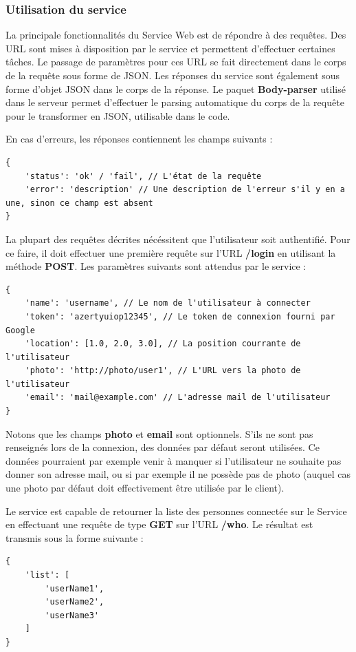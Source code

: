 \subsubsection{Utilisation du service}

La principale fonctionnalités du Service Web est de répondre à des requêtes. Des URL sont mises à disposition par le service et permettent d'effectuer certaines tâches. Le passage de paramètres pour ces URL se fait directement dans le corps de la requête sous forme de JSON.
Les réponses du service sont également sous forme d'objet JSON dans le corps de la réponse.
Le paquet \textbf{Body-parser} utilisé dans le serveur permet d'effectuer le parsing automatique du corps de la requête pour le transformer en JSON, utilisable dans le code.

En cas d'erreurs, les réponses contiennent les champs suivants :
\lstset{language=Javascript}
\begin{lstlisting}[caption=Corps général de la réponse serveur]
{
    'status': 'ok' / 'fail', // L'état de la requête
    'error': 'description' // Une description de l'erreur s'il y en a une, sinon ce champ est absent
}
\end{lstlisting}

La plupart des requêtes décrites nécéssitent que l'utilisateur soit authentifié. Pour ce faire, il doit effectuer une première requête sur l'URL \textbf{/login} en utilisant la méthode \textbf{POST}. Les paramètres suivants sont attendus par le service :
\lstset{language=Javascript}
\begin{lstlisting}[caption=Corps de la requête POST /login, label=postlogin]
{
    'name': 'username', // Le nom de l'utilisateur à connecter
    'token': 'azertyuiop12345', // Le token de connexion fourni par Google
    'location': [1.0, 2.0, 3.0], // La position courrante de l'utilisateur
    'photo': 'http://photo/user1', // L'URL vers la photo de l'utilisateur
    'email': 'mail@example.com' // L'adresse mail de l'utilisateur
}
\end{lstlisting}

Notons que les champs \textbf{photo} et \textbf{email} sont optionnels. S'ils ne sont pas renseignés lors de la connexion, des données par défaut seront utilisées. Ce données pourraient par exemple venir à manquer si l'utilisateur ne souhaite pas donner son adresse mail, ou si par exemple il ne possède pas de photo (auquel cas une photo par défaut doit effectivement être utilisée par le client).

Le service est capable de retourner la liste des personnes connectée sur le Service en effectuant une requête de type \textbf{GET} sur l'URL \textbf{/who}. Le résultat est transmis sous la forme suivante :
\lstset{language=Javascript}
\begin{lstlisting}[caption=Corps de la réponse GET /who]
{
    'list': [
        'userName1',
        'userName2',
        'userName3'
    ]
}
\end{lstlisting}

